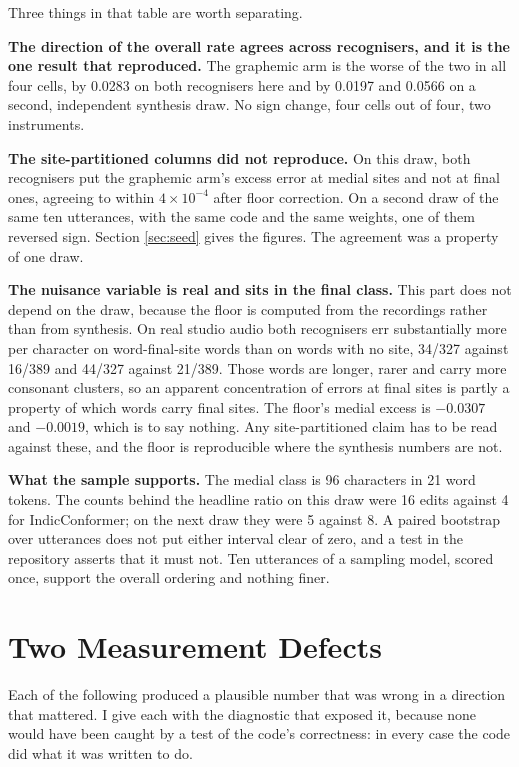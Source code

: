 \documentclass[runningheads]{llncs}
\begin{document}
Three things in that table are worth separating.

\textbf{The direction of the overall rate agrees across recognisers, and it is
the one result that reproduced.} The graphemic arm is the worse of the two in
all four cells, by 0.0283 on both recognisers here and by 0.0197 and 0.0566 on
a second, independent synthesis draw. No sign change, four cells out of four,
two instruments.

\textbf{The site-partitioned columns did not reproduce.} On this draw, both
recognisers put the graphemic arm's excess error at medial sites and not at
final ones, agreeing to within $4 \times 10^{-4}$ after floor correction. On a
second draw of the same ten utterances, with the same code and the same
weights, one of them reversed sign. Section \ref{sec:seed} gives the figures.
The agreement was a property of one draw.

\textbf{The nuisance variable is real and sits in the final class.} This part
does not depend on the draw, because the floor is computed from the recordings
rather than from synthesis. On real studio audio both recognisers err
substantially more per character on word-final-site words than on words with
no site, 34/327 against 16/389 and 44/327 against 21/389. Those words are
longer, rarer and carry more consonant clusters, so an apparent concentration
of errors at final sites is partly a property of which words carry final
sites. The floor's medial excess is $-0.0307$ and $-0.0019$, which is to say
nothing. Any site-partitioned claim has to be read against these, and the
floor is reproducible where the synthesis numbers are not.

\textbf{What the sample supports.} The medial class is 96 characters in 21
word tokens. The counts behind the headline ratio on this draw were 16 edits
against 4 for IndicConformer; on the next draw they were 5 against 8. A
paired bootstrap over utterances does not put either interval clear of zero,
and a test in the repository asserts that it must not. Ten utterances of a
sampling model, scored once, support the overall ordering and nothing finer.

\section{Two Measurement Defects}

Each of the following produced a plausible number that was wrong in a
direction that mattered. I give each with the diagnostic that exposed it,
because none would have been caught by a test of the code's correctness: in
every case the code did what it was written to do.
\end{document}
